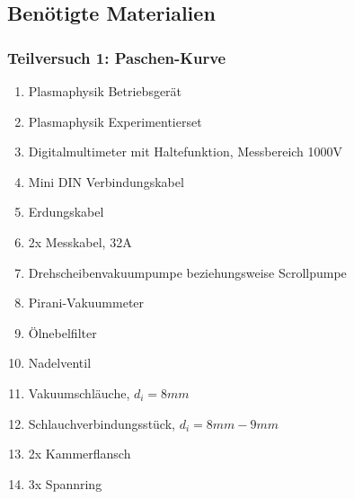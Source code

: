 \documentclass{article}
\begin{document}
\subsection{Benötigte Materialien}
    \subsubsection{Teilversuch 1: Paschen-Kurve}
        \begin{enumerate}[label=\arabic*.]
            \item Plasmaphysik Betriebsgerät
            \item Plasmaphysik Experimentierset
            \item Digitalmultimeter mit Haltefunktion, Messbereich 1000V
            \item Mini DIN Verbindungskabel
            \item Erdungskabel
            \item 2x Messkabel, 32A
            \item Drehscheibenvakuumpumpe beziehungsweise Scrollpumpe
            \item Pirani-Vakuummeter
            \item Ölnebelfilter
            \item Nadelventil
            \item Vakuumschläuche, $d_{i}=8mm$
            \item Schlauchverbindungsstück, $d_{i}=8mm-9mm$
            \item 2x Kammerflansch
            \item 3x Spannring
        \end{enumerate}
\end{document}
